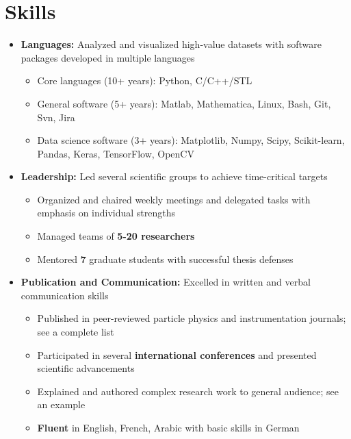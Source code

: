 \documentclass{myfancycv}
\begin{document}
\section{Skills}
\begin{itemize}

\item {\textbf{Languages:} Analyzed and visualized high-value datasets with software packages developed in multiple languages
{\begin{itemize}\setlength\itemindent{-2.2em}
\item Core languages (10+ years): Python, C/C++/STL
\item General software (5+ years): Matlab, Mathematica, Linux, Bash, Git, Svn, Jira
\item Data science software (3+ years): Matplotlib, Numpy, Scipy, Scikit-learn, Pandas, Keras, TensorFlow, OpenCV
\end{itemize}
}
}

\vspace{6pt}

\item {\textbf{Leadership:} Led several scientific groups to achieve time-critical targets
{\begin{itemize}\setlength\itemindent{-2.2em}
    \item Organized and chaired weekly meetings and delegated tasks with emphasis on individual strengths
    \item Managed teams of {\bf5-20 researchers} %
    \item Mentored {\bf 7} graduate students with successful thesis defenses



\end{itemize}}%
}

\vspace{6pt}

\item{ \textbf{Publication and Communication:} Excelled in written and verbal communication skills
{\begin{itemize}\setlength\itemindent{-2.2em}
\item Published in peer-reviewed particle physics and instrumentation journals; see a complete list \href{https://orcid.org/0000-0002-9169-0793}{}
\item Participated in several {\bf international conferences} and presented scientific advancements
\item Explained and authored complex research work to general audience; see an example \href{http://atlas.cern/updates/physics-briefing/probing-dark-matter-higgs-boson}{}
\item {\bf Fluent} in English, French, Arabic with basic skills in German

\end{itemize}}%
}


\end{itemize}
\end{document}

